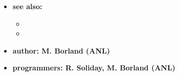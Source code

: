 \begin{itemize}
\item {\bf see also:}
    \begin{itemize}
%
%
    \item {}
    \item {}
    \end{itemize}
%
%
\item {\bf author: M. Borland (ANL)}
\item {\bf programmers: R. Soliday, M. Borland (ANL)}
\end{itemize}
